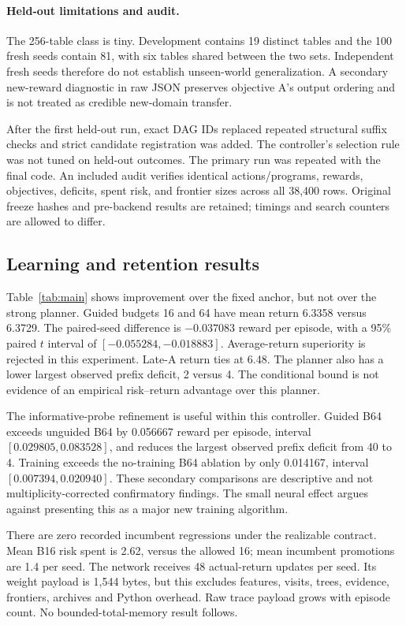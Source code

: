 \documentclass[10pt,twocolumn]{article}
\begin{document}
\paragraph{Held-out limitations and audit.}
The 256-table class is tiny. Development contains 19 distinct tables and the
100 fresh seeds contain 81, with six tables shared between the two sets.
Independent fresh seeds therefore do not establish unseen-world generalization.
A secondary new-reward diagnostic in raw JSON preserves objective A's output
ordering and is not treated as credible new-domain transfer.

After the first held-out run, exact DAG IDs replaced repeated structural suffix
checks and strict candidate registration was added. The controller's selection
rule was not tuned on held-out outcomes. The primary run was repeated with the
final code. An included audit verifies identical actions/programs, rewards,
objectives, deficits, spent risk, and frontier sizes across all 38,400 rows.
Original freeze hashes and pre-backend results are retained; timings and search
counters are allowed to differ.

\subsection{Learning and retention results}
Table~\ref{tab:main} shows improvement over the fixed anchor, but not over the
strong planner. Guided budgets 16 and 64 have mean return 6.3358 versus 6.3729.
The paired-seed difference is $-0.037083$ reward per episode, with a 95\% paired
$t$ interval of $[-0.055284,-0.018883]$. Average-return superiority is rejected
in this experiment. Late-A return ties at 6.48. The planner also has a lower
largest observed prefix deficit, 2 versus 4. The conditional bound is not
evidence of an empirical risk--return advantage over this planner.

The informative-probe refinement is useful within this controller. Guided B64
exceeds unguided B64 by 0.056667 reward per episode, interval
$[0.029805,0.083528]$, and reduces the largest observed prefix deficit from 40
to 4. Training exceeds the no-training B64 ablation by only 0.014167,
interval $[0.007394,0.020940]$. These secondary comparisons are descriptive
and not multiplicity-corrected confirmatory findings. The small neural effect
argues against presenting this as a major new training algorithm.

There are zero recorded incumbent regressions under the realizable contract.
Mean B16 risk spent is 2.62, versus the allowed 16; mean incumbent promotions are
1.4 per seed. The network receives 48 actual-return updates per seed. Its weight
payload is 1,544 bytes, but this excludes features, visits, trees, evidence,
frontiers, archives and Python overhead. Raw trace payload grows with episode
count. No bounded-total-memory result follows.
\end{document}
